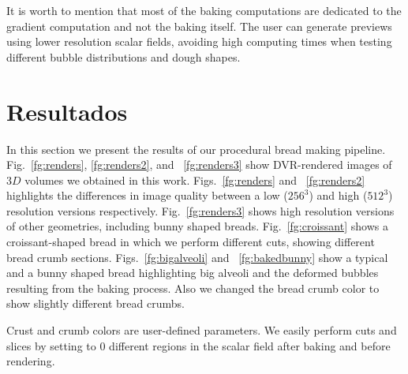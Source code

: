 \documentclass[spanish,a4paper,11pt,oneside,links]{report}
\begin{document}
It is worth to mention that most of the baking computations are dedicated to the gradient computation and not the baking itself.
The user can generate previews using lower resolution scalar fields, avoiding high computing times when testing different bubble distributions and dough shapes.


\section{Resultados}
In this section we present the results of our procedural bread making pipeline.
Fig.~\ref{fg:renders}, \ref{fg:renders2}, and ~\ref{fg:renders3} show DVR-rendered images of $3D$ volumes we obtained in this work.
Figs.~\ref{fg:renders} and ~\ref{fg:renders2} highlights the differences in image quality between a low ($256^{3}$) and high  ($512^{3}$) resolution versions respectively. Fig.~\ref{fg:renders3} shows high resolution versions of other geometries, including bunny shaped breads.
Fig.~\ref{fg:croissant} shows a croissant-shaped bread in which we perform different cuts, showing different bread crumb sections.
Figs.~\ref{fg:bigalveoli} and ~\ref{fg:bakedbunny} show a typical and a bunny shaped bread highlighting big alveoli and the deformed bubbles resulting from the baking process.
Also we changed the bread crumb color to show slightly different bread crumbs.


Crust and crumb colors are user-defined parameters. 
We easily perform cuts and slices by setting to $0$ different regions in the scalar field after baking and before rendering.




\end{document}

